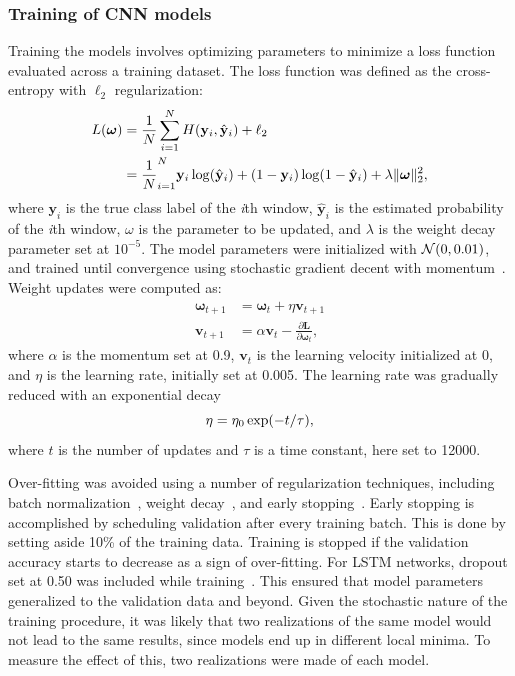 \subsubsection{Training of \ac{CNN} models}
Training the models involves optimizing parameters to minimize a loss function evaluated across a training dataset.
The loss function was defined as the cross-entropy with \(\ell_2\) regularization:
\begin{align}
\begin{split}
    \func{L}{\boldsymbol{\omega}} &= \frac{1}{N}\sum_{i=1}^{N} \func{H}{\mathbf{y}_i, \hat{\mathbf{y}}_i} + \ell_2 \\
    &= \frac{1}{N}_{i=1}^{N} \mathbf{y}_i \func{\log}{\hat{\mathbf{y}}_i} + \parentheses*{ 1 - \mathbf{y}_i } \func{\log}{1 - \hat{\mathbf{y}}_i} + \lambda \| \boldsymbol{\omega} \|^2_2,
\end{split}
\end{align}
where $\mathbf{y}_i$ is the true class label of the \textit{i}th window, $\hat{\mathbf{y}}_i$ is the estimated probability of the \textit{i}th window, $\omega$ is the parameter to be updated, and $\lambda$ is the weight decay parameter set at $10^{-5}$. 
The model parameters were initialized with $\func{\mathcal{N}}{0, 0.01}$, and trained until convergence using stochastic gradient decent with momentum~\cite{Polyak1964}. 
Weight updates were computed as: 
\begin{align}
    \boldsymbol{\omega}_{t+1} &= \boldsymbol{\omega}_t + \eta \mathbf{v}_{t+1} \\
    \mathbf{v}_{t+1} &= \alpha \mathbf{v}_t - \frac{\partial \mathbf{L}}{\partial \boldsymbol{\omega}_t},
\end{align}
where $\alpha$ is the momentum set at 0.9, $\mathbf{v}_t$ is the learning velocity initialized at 0, and $\eta$ is the learning rate, initially set at 0.005. 
The learning rate was gradually reduced with an exponential decay 
\begin{equation}
    \eta = \eta_0 \exp \parentheses*{-t/\tau},
\end{equation}
where $t$ is the number of updates and $\tau$ is a time constant, here set to \num{12000}.

Over-fitting was avoided using a number of regularization techniques, including batch normalization~\cite{Ioffe2015}, weight decay~\cite{Krogh1992}, and early stopping~\cite{Caruana2000}. 
Early stopping is accomplished by scheduling validation after every  training batch. 
This is done by setting aside 10\% of the training data.
Training is stopped if the validation accuracy starts to decrease as a sign of over-fitting. 
For \ac{LSTM} networks, dropout set at 0.50 was included while training~\cite{Srivastava2014}.
This ensured that model parameters generalized to the validation data and beyond.
Given the stochastic nature of the training procedure, it was likely that two realizations of the same model would not lead to the same results, since models end up in different local minima. 
To measure the effect of this, two realizations were made of each model.

